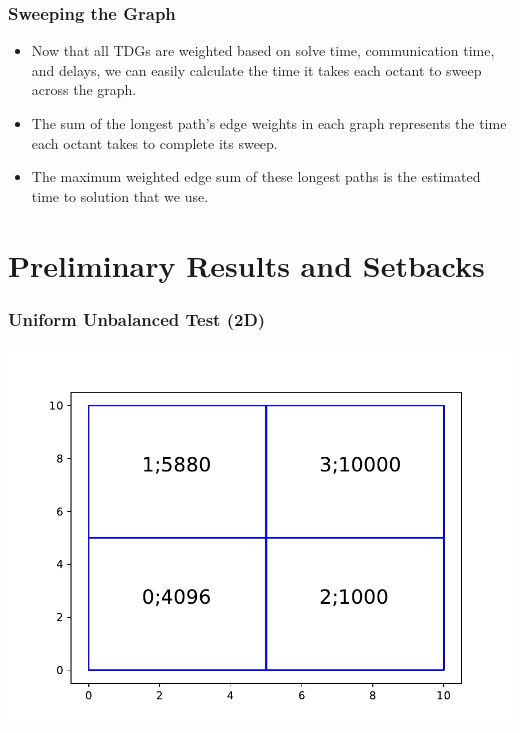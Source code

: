 \documentclass[xcolor={usenames,dvipsnames,svgnames,table}]{beamer}
\begin{document}
\begin{frame}[t]\frametitle{Sweeping the Graph}
\begin{block}{}
\begin{itemize}
	\item Now that all TDGs are weighted based on solve time, communication time, and delays, we can easily calculate the time it takes each octant to sweep across the graph. 
	\item The sum of the  longest path's edge weights in each graph represents the time each octant takes to complete its sweep.
	\item The maximum weighted edge sum of these longest paths is the estimated time to solution that we use.
\end{itemize}
\end{block}
\end{frame}

\section{Preliminary Results and Setbacks}

\begin{frame}[t]\frametitle{Uniform Unbalanced Test (2D)}
\centering
\includegraphics[trim={1cm 0cm 1cm 1cm},clip,scale=0.75]{figures/2d_layer.pdf}
\end{frame}
\end{document}
